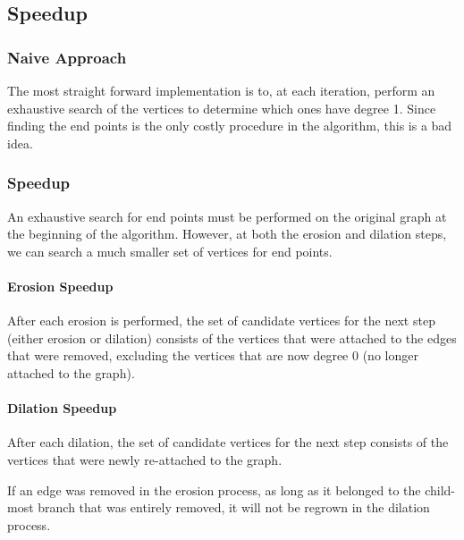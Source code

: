 \documentclass{InsightArticle}
\begin{document}
\subsection{Speedup}
\subsubsection{Naive Approach}
The most straight forward implementation is to, at each iteration, perform an exhaustive search of the vertices to determine which ones have degree 1. Since finding the end points is the only costly procedure in the algorithm, this is a bad idea.

\subsubsection{Speedup}
An exhaustive search for end points must be performed on the original graph at the beginning of the algorithm. However, at both the erosion and dilation steps, we can search a much smaller set of vertices for end points.
\paragraph{Erosion Speedup}
After each erosion is performed, the set of candidate vertices for the next step (either erosion or dilation) consists of the vertices that were attached to the edges that were removed, excluding the vertices that are now degree 0 (no longer attached to the graph).
\paragraph{Dilation Speedup}
After each dilation, the set of candidate vertices for the next step consists of the vertices that were newly re-attached to the graph.

If an edge was removed in the erosion process, as long as it belonged to the child-most branch that was entirely removed, it will not be regrown in the dilation process.

\end{document}
